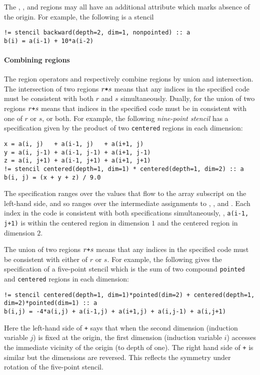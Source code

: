 \documentclass[acmlarge,review,anonymous]{acmart}\settopmatter{printfolios=true}
\theoremstyle{definition}
\theoremstyle{plain}
\begin{document}
The , , and  regions may
all have an additional attribute  which marks absence
of the origin.  For example, the following is a
  stencil
%
\begin{verbatim}
!= stencil backward(depth=2, dim=1, nonpointed) :: a
b(i) = a(i-1) + 10*a(i-2)
\end{verbatim}

\paragraph{Combining regions}

The region operators \term{+} and \term{*} respectively combine
regions by union and intersection. The intersection of two regions
$r \texttt{*} s$ means that any indices in the specified code must be
consistent with both $r$ and $s$ simultaneously.
 Dually, for the union of two regions
 $r \texttt{+} s$ means that indices in the specified code must be
 in consistent with one of $r$ or $s$, or both.
For example, the following \emph{nine-point stencil}
has a specification given by the product of two \texttt{centered}
regions in each dimension:
\begin{verbatim}
x = a(i, j)   + a(i-1, j)   + a(i+1, j)
y = a(i, j-1) + a(i-1, j-1) + a(i+1, j-1)
z = a(i, j+1) + a(i-1, j+1) + a(i+1, j+1)
!= stencil centered(depth=1, dim=1) * centered(depth=1, dim=2) :: a
b(i, j) = (x + y + z) / 9.0
\end{verbatim}
%
The specification ranges over the
values that flow to the array subscript on the left-hand side,
and so ranges over the intermediate assignments to ,
, and . Each index in the code is consistent
with both specifications simultaneously, \eg{}, \texttt{a(i-1, j+1)}
is within the centered region in dimension $1$ and the centered region
in dimension $2$.

The union of two regions $r \texttt{+} s$ means that any indices
in the specified code must be consistent with either of $r$ or $s$.
For example, the following gives the specification of a five-point
stencil which is the sum of two compound \texttt{pointed} and
\texttt{centered} regions in each dimension:
%
\begin{verbatim}
!= stencil centered(depth=1, dim=1)*pointed(dim=2) + centered(depth=1, dim=2)*pointed(dim=1) :: a
b(i,j) = -4*a(i,j) + a(i-1,j) + a(i+1,j) + a(i,j-1) + a(i,j+1)
\end{verbatim}
Here the left-hand side of \texttt{+} says that when the second dimension
(induction variable $j$) is fixed at the origin, the first dimension
(induction variable $i$) accesses the immediate vicinity of the origin
(to depth of one). The right hand side of \texttt{+} is similar but the dimensions are reversed.
This reflects the symmetry under rotation of the five-point stencil.
\end{document}
